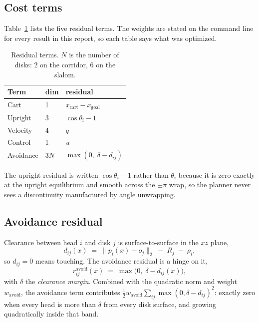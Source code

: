 \documentclass[conference]{IEEEtran}
\begin{document}
\subsection{Cost terms}

Table~\ref{tab:terms} lists the five residual terms. The weights are stated on
the command line for every result in this report, so each table says what was
optimized.

\begin{table}[t]
\caption{Residual terms. $N$ is the number of disks: 2 on the corridor, 6 on the
slalom.}
\label{tab:terms}
\centering
\begin{tabular}{@{}llp{4.1cm}@{}}
\toprule
Term & dim & residual \\
\midrule
Cart      & 1        & $x_{\text{cart}} - x_{\text{goal}}$ \\
Upright   & 3        & $\cos\theta_i - 1$ \\
Velocity  & 4        & $\dot q$ \\
Control   & 1        & $u$ \\
Avoidance & $3N$     & $\max(0,\; \delta - d_{ij})$ \\
\bottomrule
\end{tabular}
\end{table}

The upright residual is written $\cos\theta_i - 1$ rather than $\theta_i$
because it is zero exactly at the upright equilibrium and smooth across the
$\pm\pi$ wrap, so the planner never sees a discontinuity manufactured by angle
unwrapping.

\subsection{Avoidance residual}
\label{sec:avoidance}

Clearance between head $i$ and disk $j$ is surface-to-surface in the $xz$ plane,
\begin{equation}
d_{ij}(x) \;=\; \big\| p_i(x) - o_j \big\|_2 \;-\; R_j \;-\; \rho_i,
\label{eq:clearance}
\end{equation}
so $d_{ij} = 0$ means touching. The avoidance residual is a hinge on it,
\begin{equation}
r^{\text{avoid}}_{ij}(x) \;=\; \max\!\big(0,\; \delta - d_{ij}(x)\big),
\label{eq:hinge}
\end{equation}
with $\delta$ the \emph{clearance margin}. Combined with the quadratic norm and
weight $w_{\text{avoid}}$, the avoidance term contributes
$\tfrac{1}{2} w_{\text{avoid}} \sum_{ij} \max(0, \delta - d_{ij})^2$: exactly
zero when every head is more than $\delta$ from every disk surface, and growing
quadratically inside that band.
\end{document}
